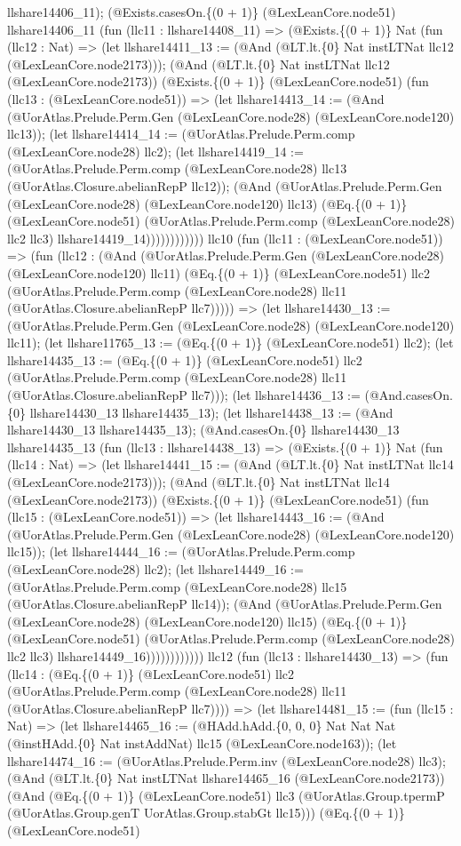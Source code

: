 \documentclass[11pt]{article}
\begin{document}
llshare14406\_11); (@Exists.casesOn.\{(0 + 1)\} (@LexLeanCore.node51) llshare14406\_11 (fun (llc11 : llshare14408\_11) => (@Exists.\{(0 + 1)\} Nat (fun (llc12 : Nat) => (let llshare14411\_13 := (@And (@LT.lt.\{0\} Nat instLTNat llc12 (@LexLeanCore.node2173))); (@And (@LT.lt.\{0\} Nat instLTNat llc12 (@LexLeanCore.node2173)) (@Exists.\{(0 + 1)\} (@LexLeanCore.node51) (fun (llc13 : (@LexLeanCore.node51)) => (let llshare14413\_14 := (@And (@UorAtlas.Prelude.Perm.Gen (@LexLeanCore.node28) (@LexLeanCore.node120) llc13)); (let llshare14414\_14 := (@UorAtlas.Prelude.Perm.comp (@LexLeanCore.node28) llc2); (let llshare14419\_14 := (@UorAtlas.Prelude.Perm.comp (@LexLeanCore.node28) llc13 (@UorAtlas.Closure.abelianRepP llc12)); (@And (@UorAtlas.Prelude.Perm.Gen (@LexLeanCore.node28) (@LexLeanCore.node120) llc13) (@Eq.\{(0 + 1)\} (@LexLeanCore.node51) (@UorAtlas.Prelude.Perm.comp (@LexLeanCore.node28) llc2 llc3) llshare14419\_14)))))))))))) llc10 (fun (llc11 : (@LexLeanCore.node51)) => (fun (llc12 : (@And (@UorAtlas.Prelude.Perm.Gen (@LexLeanCore.node28) (@LexLeanCore.node120) llc11) (@Eq.\{(0 + 1)\} (@LexLeanCore.node51) llc2 (@UorAtlas.Prelude.Perm.comp (@LexLeanCore.node28) llc11 (@UorAtlas.Closure.abelianRepP llc7))))) => (let llshare14430\_13 := (@UorAtlas.Prelude.Perm.Gen (@LexLeanCore.node28) (@LexLeanCore.node120) llc11); (let llshare11765\_13 := (@Eq.\{(0 + 1)\} (@LexLeanCore.node51) llc2); (let llshare14435\_13 := (@Eq.\{(0 + 1)\} (@LexLeanCore.node51) llc2 (@UorAtlas.Prelude.Perm.comp (@LexLeanCore.node28) llc11 (@UorAtlas.Closure.abelianRepP llc7))); (let llshare14436\_13 := (@And.casesOn.\{0\} llshare14430\_13 llshare14435\_13); (let llshare14438\_13 := (@And llshare14430\_13 llshare14435\_13); (@And.casesOn.\{0\} llshare14430\_13 llshare14435\_13 (fun (llc13 : llshare14438\_13) => (@Exists.\{(0 + 1)\} Nat (fun (llc14 : Nat) => (let llshare14441\_15 := (@And (@LT.lt.\{0\} Nat instLTNat llc14 (@LexLeanCore.node2173))); (@And (@LT.lt.\{0\} Nat instLTNat llc14 (@LexLeanCore.node2173)) (@Exists.\{(0 + 1)\} (@LexLeanCore.node51) (fun (llc15 : (@LexLeanCore.node51)) => (let llshare14443\_16 := (@And (@UorAtlas.Prelude.Perm.Gen (@LexLeanCore.node28) (@LexLeanCore.node120) llc15)); (let llshare14444\_16 := (@UorAtlas.Prelude.Perm.comp (@LexLeanCore.node28) llc2); (let llshare14449\_16 := (@UorAtlas.Prelude.Perm.comp (@LexLeanCore.node28) llc15 (@UorAtlas.Closure.abelianRepP llc14)); (@And (@UorAtlas.Prelude.Perm.Gen (@LexLeanCore.node28) (@LexLeanCore.node120) llc15) (@Eq.\{(0 + 1)\} (@LexLeanCore.node51) (@UorAtlas.Prelude.Perm.comp (@LexLeanCore.node28) llc2 llc3) llshare14449\_16)))))))))))) llc12 (fun (llc13 : llshare14430\_13) => (fun (llc14 : (@Eq.\{(0 + 1)\} (@LexLeanCore.node51) llc2 (@UorAtlas.Prelude.Perm.comp (@LexLeanCore.node28) llc11 (@UorAtlas.Closure.abelianRepP llc7)))) => (let llshare14481\_15 := (fun (llc15 : Nat) => (let llshare14465\_16 := (@HAdd.hAdd.\{0, 0, 0\} Nat Nat Nat (@instHAdd.\{0\} Nat instAddNat) llc15 (@LexLeanCore.node163)); (let llshare14474\_16 := (@UorAtlas.Prelude.Perm.inv (@LexLeanCore.node28) llc3); (@And (@LT.lt.\{0\} Nat instLTNat llshare14465\_16 (@LexLeanCore.node2173)) (@And (@Eq.\{(0 + 1)\} (@LexLeanCore.node51) llc3 (@UorAtlas.Group.tpermP (@UorAtlas.Group.genT UorAtlas.Group.stabGt llc15))) (@Eq.\{(0 + 1)\} (@LexLeanCore.node51) 
\end{document}
